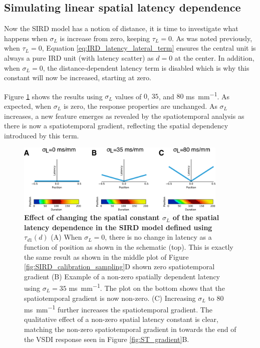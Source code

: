\documentclass[phd,ianc,twoside]{infthesis}
\begin{document}
\subsection{Simulating linear spatial latency dependence}

Now the SIRD model has a notion of distance, it is time to investigate
what happens when $\sigma_L$ is increase from zero, keeping
$\tau_L=0$. As was noted previously, when $\tau_L=0$, Equation
\ref{eq:IRD_latency_lateral_term} ensures the central unit is always a
pure IRD unit (with latency scatter) as $d=0$ at the center. In
addition, when $\sigma_L=0$, the distance-dependent latency term is
disabled which is why this constant will now be increased, starting at
zero.

Figure \ref{fig:sird_calibration_spatial} shows the results using
$\sigma_L$ values of $0$, $35$, and $80$ \si{ms.mm^{-1}}. As expected,
when $\sigma_L$ is zero, the response properties are unchanged.  As
$\sigma_L$ increases, a new feature emerges as revealed by the
spatiotemporal analysis as there is now a spatiotemporal gradient,
reflecting the spatial dependency introduced by this term.

\begin{figure}
  \center
  \includegraphics[width=0.9\textwidth]{./figures/sird_calibration_spatial.pdf}
\caption{{\bf Effect of changing the spatial constant $\sigma_L$ of the
    spatial latency dependence in the SIRD model defined using
    $\tau_{d1}(d)$ } (A) When $\sigma_L=0$, there is no change in
  latency as a function of position as shown in the schematic
  (top). This is exactly the same result as shown in the middle plot of
  Figure \ref{fig:SIRD_calibration_sampling}D shown zero spatiotemporal
  gradient (B) Example of a non-zero spatially dependent latency using
  $\sigma_L=35$ \si{ms.mm^{-1}}. The plot on the bottom shows that the
  spatiotemporal gradient is now non-zero. (C) Increasing $\sigma_L$ to
  $80$ \si{ms.mm^{-1}} further increases the spatiotemporal
  gradient. The qualitative effect of a non-zero spatial latency
  constant is clear, matching the non-zero spatiotemporal gradient in
  towards the end of the VSDI response seen in Figure
  \ref{fig:ST_gradient}B.}
\label{fig:sird_calibration_spatial}
\end{figure}
\end{document}
